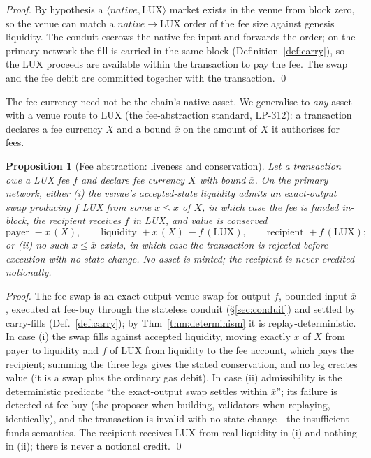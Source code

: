 \documentclass[11pt,a4paper]{article}
\newtheorem{proposition}{Proposition}[section]
\begin{document}
\begin{proof}
By hypothesis a $\langle \mathit{native}, \mathrm{LUX}\rangle$ market exists in the venue from block
zero, so the venue can match a $\mathit{native}\!\to\!\mathrm{LUX}$ order of the fee size against
genesis liquidity. The conduit escrows the native fee input and forwards the order; on the primary
network the fill is carried in the same block (Definition~\ref{def:carry}), so the LUX proceeds are
available within the transaction to pay the fee. The swap and the fee debit are committed together
with the transaction. \qed
\end{proof}

The fee currency need not be the chain's native asset. We generalise to \emph{any} asset with a
venue route to LUX (the fee-abstraction standard, LP-312): a transaction declares a fee currency
$X$ and a bound $\overline{x}$ on the amount of $X$ it authorises for fees.

\begin{proposition}[Fee abstraction: liveness and conservation]\label{prop:feeabs}
Let a transaction owe a LUX fee $f$ and declare fee currency $X$ with bound $\overline{x}$. On the
primary network, either (i) the venue's accepted-state liquidity admits an exact-output swap
producing $f$ LUX from some $x\le\overline{x}$ of $X$, in which case the fee is funded in-block, the
recipient receives $f$ in LUX, and value is conserved
\[
   \text{payer } -x\,(X),\qquad
   \text{liquidity } +x\,(X)\ -f\,(\mathrm{LUX}),\qquad
   \text{recipient } +f\,(\mathrm{LUX});
\]
or (ii) no such $x\le\overline{x}$ exists, in which case the transaction is rejected before
execution with no state change. No asset is minted; the recipient is never credited notionally.
\end{proposition}

\begin{proof}
The fee swap is an exact-output venue swap for output $f$, bounded input $\overline{x}$, executed at
fee-buy through the stateless conduit (\S\ref{sec:conduit}) and settled by carry-fills
(Def.~\ref{def:carry}); by Thm~\ref{thm:determinism} it is replay-deterministic. In case (i) the
swap fills against accepted liquidity, moving exactly $x$ of $X$ from payer to liquidity and $f$ of
LUX from liquidity to the fee account, which pays the recipient; summing the three legs gives the
stated conservation, and no leg creates value (it is a swap plus the ordinary gas debit). In case
(ii) admissibility is the deterministic predicate ``the exact-output swap settles within
$\overline{x}$''; its failure is detected at fee-buy (the proposer when building, validators when
replaying, identically), and the transaction is invalid with no state change---the
insufficient-funds semantics. The recipient receives LUX from real liquidity in (i) and nothing in
(ii); there is never a notional credit. \qed
\end{proof}
\end{document}
